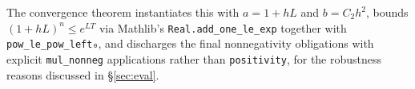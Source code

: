 \documentclass[sigplan,nonacm,screen,review]{acmart}
\begin{document}
The convergence theorem instantiates this with $a = 1 + hL$ and $b = C_2 h^2$,
bounds $(1+hL)^n \le e^{LT}$ via Mathlib's \lstinline[language=lean]|Real.add_one_le_exp|
together with \lstinline[language=lean]|pow_le_pow_left₀|, and discharges the final
nonnegativity obligations with explicit \lstinline[language=lean]|mul_nonneg|
applications rather than \lstinline[language=lean]|positivity|, for the
robustness reasons discussed in \S\ref{sec:eval}.
\end{document}
